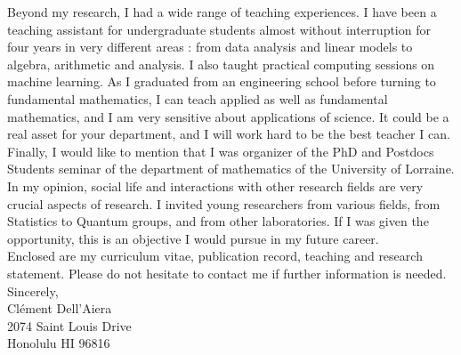 \documentclass[a4paper]{article}
\begin{document}
Beyond my research, I had a wide range of teaching experiences. I have been a teaching assistant for undergraduate students almost without interruption for four years in very different areas : from data analysis and linear models to algebra, arithmetic and analysis. I also taught practical computing sessions on machine learning. As I graduated from an engineering school before turning to fundamental mathematics, I can teach applied as well as fundamental mathematics, and I am very sensitive about applications of science. It could be a real asset for your department, and I will work hard to be the best teacher I can. \\

Finally, I would like to mention that I was organizer of the PhD and Postdocs Students seminar of the department of mathematics of the University of Lorraine. In my opinion, social life and interactions with other research fields are very crucial aspects of research. I invited young researchers from various fields, from Statistics to Quantum groups, and from other laboratories. If I was given the opportunity, this is an objective I would pursue in my future career. \\

Enclosed are my curriculum vitae, publication record, teaching and research statement. Please do not hesitate to contact me if further information is needed. \\

Sincerely,\\

Clément Dell’Aiera\\
2074 Saint Louis Drive\\
Honolulu HI 96816\\

\newpage

 
\end{document}
